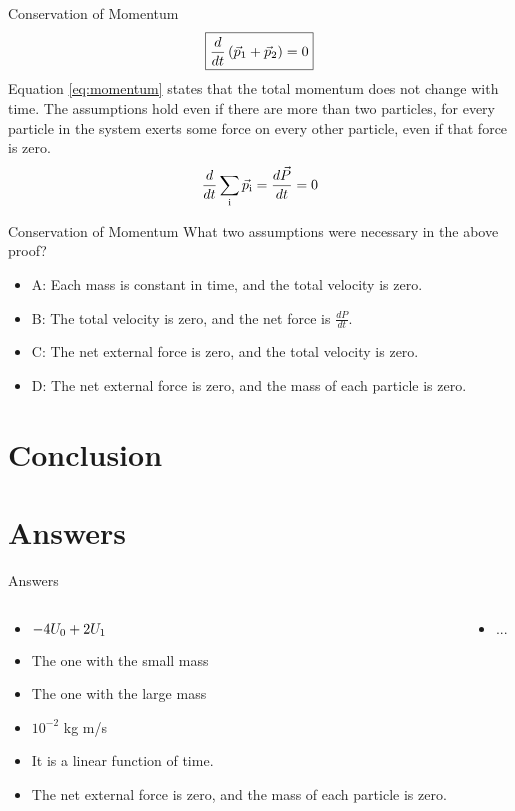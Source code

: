 \documentclass{beamer}
\begin{document}
\begin{frame}{Conservation of Momentum}
\begin{equation}
\boxed{
\frac{d}{dt}\left(\vec{p}_{\rm 1} + \vec{p}_{\rm 2}\right) = 0
} \label{eq:momentum}
\end{equation}
Equation \ref{eq:momentum} states that the total momentum does not change with time.  The assumptions hold even if there are more than two particles, for every particle in the system exerts some force on every other particle, even if that force is zero.
\begin{equation}
\frac{d}{dt}\sum_{\rm i} \vec{p}_{\rm i} = \frac{d\vec{P}}{dt} = 0
\end{equation}
\end{frame}

\begin{frame}{Conservation of Momentum}
What two assumptions were necessary in the above proof?
\begin{itemize}
\item A: Each mass is constant in time, and the total velocity is zero.
\item B: The total velocity is zero, and the net force is $\frac{dP}{dt}$.
\item C: The net external force is zero, and the total velocity is zero.
\item D: The net external force is zero, and the mass of each particle is zero.
\end{itemize}
\end{frame}

\section{Conclusion}

\section{Answers}

\begin{frame}{Answers}
\begin{columns}[T]
\begin{column}{0.5\textwidth}
\begin{itemize}
\item $-4U_{\rm 0} + 2U_{\rm 1}$
\item The one with the small mass
\item The one with the large mass
\item $10^{-2}$ kg m/s
\item It is a linear function of time.
\item The net external force is zero, and the mass of each particle is zero.
\end{itemize}
\end{column}
\begin{column}{0.5\textwidth}
\begin{itemize}
\item ...
\end{itemize}
\end{column}
\end{columns}
\end{frame}
\end{document}
